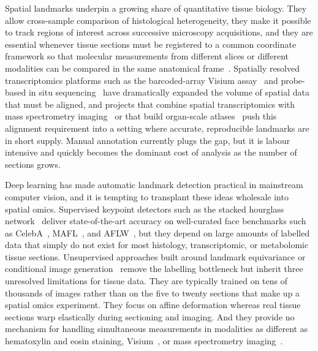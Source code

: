 \documentclass[11pt]{article}
\begin{document}
Spatial landmarks underpin a growing share of quantitative tissue biology. They allow cross-sample comparison of histological heterogeneity, they make it possible to track regions of interest across successive microscopy acquisitions, and they are essential whenever tissue sections must be registered to a common coordinate framework so that molecular measurements from different slices or different modalities can be compared in the same anatomical frame~\cite{moses2022museum,marx2021method}. Spatially resolved transcriptomics platforms such as the barcoded-array Visium assay~\cite{stahl2016visualization} and probe-based in situ sequencing~\cite{ke2013insitu} have dramatically expanded the volume of spatial data that must be aligned, and projects that combine spatial transcriptomics with mass spectrometry imaging~\cite{vicari2024spatial} or that build organ-scale atlases~\cite{asp2019spatiotemporal} push this alignment requirement into a setting where accurate, reproducible landmarks are in short supply. Manual annotation currently plugs the gap, but it is labour intensive and quickly becomes the dominant cost of analysis as the number of sections grows.

Deep learning has made automatic landmark detection practical in mainstream computer vision, and it is tempting to transplant these ideas wholesale into spatial omics. Supervised keypoint detectors such as the stacked hourglass network~\cite{newell2016stacked} deliver state-of-the-art accuracy on well-curated face benchmarks such as CelebA~\cite{liu2015celeba}, MAFL~\cite{zhang2016learning}, and AFLW~\cite{kostinger2011aflw}, but they depend on large amounts of labelled data that simply do not exist for most histology, transcriptomic, or metabolomic tissue sections. Unsupervised approaches built around landmark equivariance or conditional image generation~\cite{thewlis2017unsupervised,jakab2018conditional,zhang2018unsupervised,sanchez2019object,jakab2020selfsupervised} remove the labelling bottleneck but inherit three unresolved limitations for tissue data. They are typically trained on tens of thousands of images rather than on the five to twenty sections that make up a spatial omics experiment. They focus on affine deformation whereas real tissue sections warp elastically during sectioning and imaging. And they provide no mechanism for handling simultaneous measurements in modalities as different as hematoxylin and eosin staining, Visium~\cite{stahl2016visualization}, or mass spectrometry imaging~\cite{vicari2024spatial}.
\end{document}
